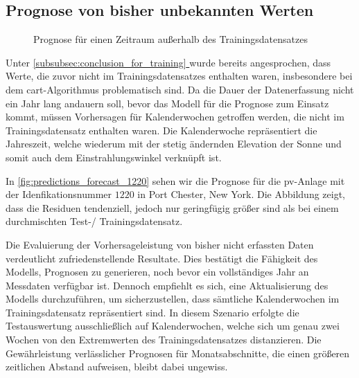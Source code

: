 \documentclass[12pt, a4paper]{article}
\newcommand*{\fullref}[1]{\hyperref[{#1}]{\autoref*{#1} \textit{\nameref*{#1}}}}
\begin{document}
\subsection{Prognose von bisher unbekannten Werten}


\begin{figure}[h]
\centering
\def\svgwidth{400pt}

\caption{Prognose für einen Zeitraum außerhalb des Trainingsdatensatzes}
\label{fig:predictions_forecast_1220}
\end{figure}

Unter \fullref{subsubsec:conclusion_for_training} wurde bereits angesprochen, dass Werte, die zuvor nicht im Trainingsdatensatzes enthalten waren, insbesondere bei dem \ac{cart}-Algorithmus problematisch sind. Da die Dauer der Datenerfassung nicht ein Jahr lang andauern soll, bevor das Modell für die Prognose zum Einsatz kommt, müssen Vorhersagen für Kalenderwochen getroffen werden, die nicht im Trainingsdatensatz enthalten waren. Die Kalenderwoche repräsentiert die Jahreszeit, welche wiederum mit der stetig ändernden Elevation der Sonne und somit auch dem Einstrahlungswinkel verknüpft ist.

In \autoref{fig:predictions_forecast_1220} sehen wir die Prognose für die \ac{pv}-Anlage mit der Idenfikationsnummer $1220$ in Port Chester, New York. Die Abbildung zeigt, dass die Residuen tendenziell, jedoch nur geringfügig größer sind als bei einem durchmischten Test-/ Trainingsdatensatz.

Die Evaluierung der Vorhersageleistung von bisher nicht erfassten Daten verdeutlicht zufriedenstellende Resultate. Dies bestätigt die Fähigkeit des Modells, Prognosen zu generieren, noch bevor ein vollständiges Jahr an Messdaten verfügbar ist. Dennoch empfiehlt es sich, eine Aktualisierung des Modells durchzuführen, um sicherzustellen, dass sämtliche Kalenderwochen im Trainingsdatensatz repräsentiert sind. In diesem Szenario erfolgte die Testauswertung ausschließlich auf Kalenderwochen, welche sich um genau zwei Wochen von den Extremwerten des Trainingsdatensatzes distanzieren. Die Gewährleistung verlässlicher Prognosen für Monatsabschnitte, die einen größeren zeitlichen Abstand aufweisen, bleibt dabei ungewiss.

\end{document}
